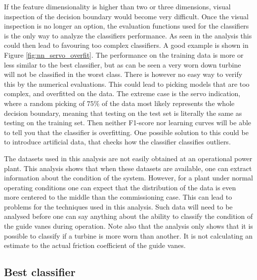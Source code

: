     If the feature dimensionality is higher than two or three dimensions, visual inspection of the decision boundary would become very difficult. Once the visual inspection is no longer an option, the evaluation functions used for the classifiers is the only way to analyze the classifiers performance. As seen in the analysis this could then lead to favouring too complex classifiers. A good example is shown in Figure \ref{fig:nn_servo_overfit}. The performance on the training data is more or less similar to the best classifier, but as can be seen a very worn down turbine will not be classified in the worst class. There is however no easy way to verify this by the numerical evaluations. This could lead to picking models that are too complex, and overfitted on the data. The extreme case is the servo indication, where a random picking of $75 \%$ of the data most likely represents the whole decision boundary, meaning that testing on the test set is literally the same as testing on the training set. Then neither F1-score nor learning curves will be able to tell you that the classifier is overfitting. One possible solution to this could be to introduce artificial data, that checks how the classifier classifies outliers. 
    
    The datasets used in this analysis are not easily obtained at an operational power plant. This analysis shows that when these datasets are available, one can extract information about the condition of the system. However, for a plant under normal operating conditions one can expect that the distribution of the data is even more centered to the middle than the commissioning case. This can lead to problems for the techniques used in this analysis. Such data will need to be analysed before one can say anything about the ability to classify the condition of the guide vanes during operation. Note also that the analysis only shows that it is possible to classify if a turbine is more worn than another. It is not calculating an estimate to the actual friction coefficient of the guide vanes. 
    
    \subsection{Best classifier}
